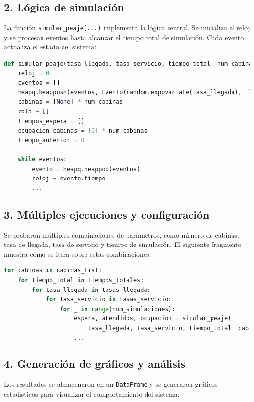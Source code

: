 \documentclass[12pt]{article}
\begin{document}
\subsection*{2. Lógica de simulación}

La función \texttt{simular\_peaje(...)} implementa la lógica central. Se inicializa el reloj y se procesan eventos hasta alcanzar el tiempo total de simulación. Cada evento actualiza el estado del sistema:

\begin{lstlisting}[language=Python, caption={Estructura principal de la simulación}]
def simular_peaje(tasa_llegada, tasa_servicio, tiempo_total, num_cabinas):
    reloj = 0
    eventos = []
    heapq.heappush(eventos, Evento(random.expovariate(tasa_llegada), 'llegada'))
    cabinas = [None] * num_cabinas
    cola = []
    tiempos_espera = []
    ocupacion_cabinas = [0] * num_cabinas
    tiempo_anterior = 0

    while eventos:
        evento = heapq.heappop(eventos)
        reloj = evento.tiempo
        ...
\end{lstlisting}

\subsection*{3. Múltiples ejecuciones y configuración}

Se probaron múltiples combinaciones de parámetros, como número de cabinas, tasa de llegada, tasa de servicio y tiempo de simulación. El siguiente fragmento muestra cómo se itera sobre estas combinaciones:

\begin{lstlisting}[language=Python, caption={Ejecución de múltiples simulaciones}]
for cabinas in cabinas_list:
    for tiempo_total in tiempos_totales:
        for tasa_llegada in tasas_llegada:
            for tasa_servicio in tasas_servicio:
                for _ in range(num_simulaciones):
                    espera, atendidos, ocupacion = simular_peaje(
                        tasa_llegada, tasa_servicio, tiempo_total, cabinas)
                    ...
\end{lstlisting}

\subsection*{4. Generación de gráficos y análisis}

Los resultados se almacenaron en un \texttt{DataFrame} y se generaron gráficos estadísticos para visualizar el comportamiento del sistema:
\end{document}
